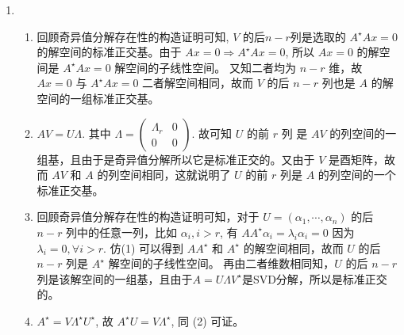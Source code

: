 \documentclass{article}
\begin{document}
\begin{spacing}{1.5}
\begin{enumerate}
        \item [2.5 习题5]
            \begin{enumerate}
                \item [(1)] 回顾奇异值分解存在性的构造证明可知, $V$ 的后$n-r$列是选取的 $A^\star Ax=0$ 的解空间的标准正交基。由于 $Ax=0\Rightarrow A^\star Ax=0$, 所以 $Ax=0$ 的解空间是 $A^\star Ax=0$ 解空间的子线性空间。
                又知二者均为 $n-r$ 维，故 $Ax=0$ 与 $A^\star Ax=0$ 二者解空间相同，故而 $V$ 的后 $n-r$ 列也是 $A$ 的解空间的一组标准正交基。 
                \item [(2)] $AV = U\Lambda$. 其中 $\Lambda = \left(\begin{array}{cc}\Lambda_r&0\\0&0\end{array}\right)$. 故可知 $U$ 的前 $r$ 列 是 $AV$ 的列空间的一组基，且由于是奇异值分解所以它是标准正交的。又由于 $V$ 是酉矩阵，故而 $AV$ 和 $A$ 的列空间相同，这就说明了 $U$ 的前 $r$ 列是 $A$ 的列空间的一个标准正交基。
                \item [(3)] 回顾奇异值分解存在性的构造证明可知，对于 $U=(\alpha_1,\cdots,\alpha_n)$ 的后 $n-r$ 列中的任意一列，比如 $\alpha_i, i>r$, 有 $AA^\star\alpha_i = \lambda_i\alpha_i = 0$ 因为 $\lambda_i = 0 , \forall i > r$. 仿(1) 可以得到 $AA^\star$ 和 $A^\star$ 的解空间相同，故而 $U$ 的后 $n-r$ 列是 $A^\star$ 解空间的子线性空间。
                            再由二者维数相同知，$U$ 的后 $n-r$ 列是该解空间的一组基，且由于$A=U\Lambda V^\star$是SVD分解，所以是标准正交的。
                \item [(4)] $A^\star = V\Lambda^\star U^\star$, 故 $A^\star U = V\Lambda^\star$, 同 (2) 可证。
            \end{enumerate}
        

\end{enumerate}
\end{spacing}
\end{document}
